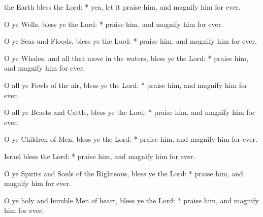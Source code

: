 { the Earth bless the Lord: * yea, let it praise him, and magnify him for ever.\par
{}
    O ye Wells, bless ye the Lord: * praise him, and magnify him for ever.\par
    O ye Seas and Floods, bless ye the Lord: * praise him, and magnify him for ever.\par
    O ye Whales, and all that move in the waters, bless ye the Lord: * praise him, and magnify him for ever.\par
    O all ye Fowls of the air, bless ye the Lord: * praise him, and magnify him for ever.\par
    O all ye Beasts and Cattle, bless ye the Lord: * praise him, and magnify him for ever.\par
    O ye Children of Men, bless ye the Lord: * praise him, and magnify him for ever.
    
 Israel bless the Lord: * praise him, and magnify him for ever.\par
{}
    O ye Spirits and Souls of the Righteous, bless ye the Lord: * praise him, and magnify him for ever.\par
    O ye holy and humble Men of heart, bless ye the Lord: * praise him, and magnify him for ever.

}
